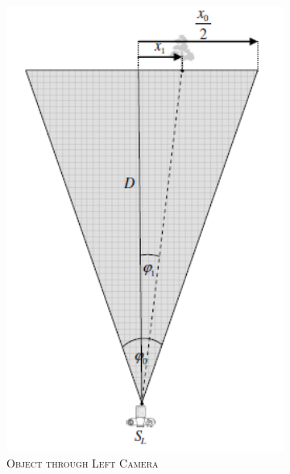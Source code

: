 \begin{figure}[h]
	\begin{subfigure}[b]{0.4\textwidth}
		\centering
		\includegraphics[width=1.3\textwidth,scale=2]{project/images/l.png}
		\caption{\textsc{Object through Left Camera}}
		\label{fig:3}
	\end{subfigure}
	\hspace{2cm}
	\begin{subfigure}[b]{0.4\textwidth}
		\centering

\end{subfigure}
\end{figure}
